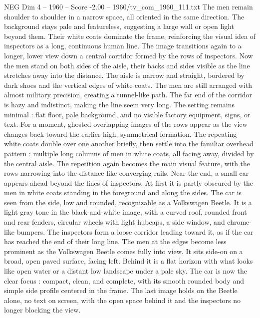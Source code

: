 \begin{textsample}{NEG Dim 4 – 1960 – Score -2.00 – 1960/tv\_com\_1960\_111.txt}
The men remain shoulder to shoulder in a narrow space, all oriented in the same direction.
The background stays pale and featureless, suggesting a large wall or open light beyond them.
Their white coats dominate the frame, reinforcing the visual idea of inspectors as a long, continuous human line.
The image transitions again to a longer, lower view down a central corridor formed by the rows of inspectors.
Now the men stand on both sides of the aisle, their backs and sides visible as the line stretches away into the distance.
The aisle is narrow and straight, bordered by dark shoes and the vertical edges of white coats.
The men are still arranged with almost military precision, creating a tunnel-like path.
The far end of the corridor is hazy and indistinct, making the line seem very long.
The setting remains minimal : flat floor, pale background, and no visible factory equipment, signs, or text.
For a moment, ghosted overlapping images of the rows appear as the view changes back toward the earlier high, symmetrical formation.
The repeating white coats double over one another briefly, then settle into the familiar overhead pattern : multiple long columns of men in white coats, all facing away, divided by the central aisle.
The repetition again becomes the main visual feature, with the rows narrowing into the distance like converging rails.
Near the end, a small car appears ahead beyond the lines of inspectors.
At first it is partly obscured by the men in white coats standing in the foreground and along the sides.
The car is seen from the side, low and rounded, recognizable as a Volkswagen Beetle.
It is a light gray tone in the black-and-white image, with a curved roof, rounded front and rear fenders, circular wheels with light hubcaps, a side window, and chrome-like bumpers.
The inspectors form a loose corridor leading toward it, as if the car has reached the end of their long line.
The men at the edges become less prominent as the Volkswagen Beetle comes fully into view.
It sits side-on on a broad, open paved surface, facing left.
Behind it is a flat horizon with what looks like open water or a distant low landscape under a pale sky.
The car is now the clear focus : compact, clean, and complete, with its smooth rounded body and simple side profile centered in the frame.
The last image holds on the Beetle alone, no text on screen, with the open space behind it and the inspectors no longer blocking the view.

\end{textsample}
